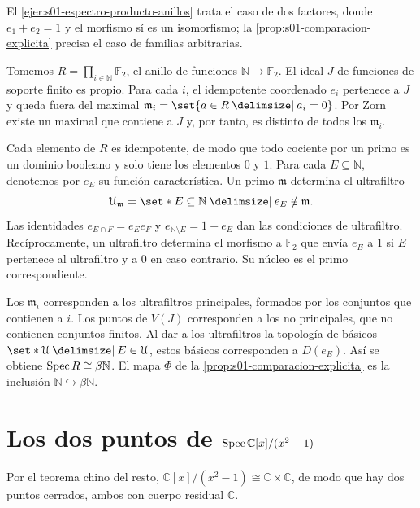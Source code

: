 \begin{obs}
\label{obs:s01-ejercicio-expuesto-clase-dos-factores}
El \cref{ejer:s01-espectro-producto-anillos} trata el caso de dos factores, donde $e_1+e_2=1$ y el morfismo sí es un isomorfismo; la \cref{prop:s01-comparacion-explicita} precisa el caso de familias arbitrarias.
\end{obs}

\begin{ejem}
\label{ejem:s01-ultrafiltros-producto-infinito}
Tomemos $R=\prod_{i\in\mathbb N}\mathbb F_2$, el anillo de funciones $\mathbb N\to\mathbb F_2$. El ideal $J$ de funciones de soporte finito es propio. Para cada $i$, el idempotente coordenado $e_i$ pertenece a $J$ y queda fuera del maximal $\mathfrak m_i=\set{a\in R\given a_i=0}$. Por Zorn existe un maximal que contiene a $J$ y, por tanto, es distinto de todos los $\mathfrak m_i$.

Cada elemento de $R$ es idempotente, de modo que todo cociente por un primo es un dominio booleano y solo tiene los elementos $0$ y $1$. Para cada $E\subseteq\mathbb N$, denotemos por $e_E$ su función característica. Un primo $\mathfrak m$ determina el ultrafiltro
\[
\mathcal U_{\mathfrak m}=\set*{E\subseteq\mathbb N\given e_E\notin\mathfrak m}.
\]
Las identidades $e_{E\cap F}=e_Ee_F$ y $e_{\mathbb N\setminus E}=1-e_E$ dan las condiciones de ultrafiltro. Recíprocamente, un ultrafiltro determina el morfismo a $\mathbb F_2$ que envía $e_E$ a $1$ si $E$ pertenece al ultrafiltro y a $0$ en caso contrario. Su núcleo es el primo correspondiente.

Los $\mathfrak m_i$ corresponden a los ultrafiltros principales, formados por los conjuntos que contienen a $i$. Los puntos de $V(J)$ corresponden a los no principales, que no contienen conjuntos finitos. Al dar a los ultrafiltros la topología de básicos $\set*{\mathcal U\given E\in\mathcal U}$, estos básicos corresponden a $D(e_E)$. Así se obtiene $\operatorname{Spec} R\cong\beta\mathbb N$. El mapa $\Phi$ de la \cref{prop:s01-comparacion-explicita} es la inclusión $\mathbb N\hookrightarrow\beta\mathbb N$.
\end{ejem}

\section{Los dos puntos de \texorpdfstring{$\operatorname{Spec} \mathbb{C}[x]/(x^2-1)$}{Spec C[x]/(x2 - 1)}}

Por el teorema chino del resto, $\mathbb C[x]/(x^2-1)\cong\mathbb C\times\mathbb C$, de modo que hay dos puntos cerrados, ambos con cuerpo residual $\mathbb C$.

